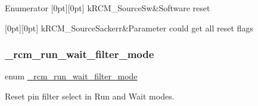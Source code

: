 \begin{DoxyEnumFields}{Enumerator}
[0pt][0pt]{}\mbox{\label{group__rcm_gga089aeb2329dd1c555a9a7493f3efff6aac58247e936b5acc7c22d19ccd78b7c01}} 
k\+R\+C\+M\+\_\+\+Source\+Sw&Software reset \\
\hline

[0pt][0pt]{}\mbox{\label{group__rcm_gga089aeb2329dd1c555a9a7493f3efff6aab7584c0988c7c3d17d50b46aa096d710}} 
k\+R\+C\+M\+\_\+\+Source\+Sackerr&Parameter could get all reset flags \\
\hline

\end{DoxyEnumFields}
\mbox{\label{group__rcm_ga1e89ca2ffc3856208be42ca30c191b4d}} 
\subsubsection{\texorpdfstring{\_rcm\_run\_wait\_filter\_mode}{\_rcm\_run\_wait\_filter\_mode}}
{\footnotesize\ttfamily enum \mbox{\hyperlink{group__rcm_ga1e89ca2ffc3856208be42ca30c191b4d}{\+\_\+rcm\+\_\+run\+\_\+wait\+\_\+filter\+\_\+mode}}}



Reset pin filter select in Run and Wait modes. 

